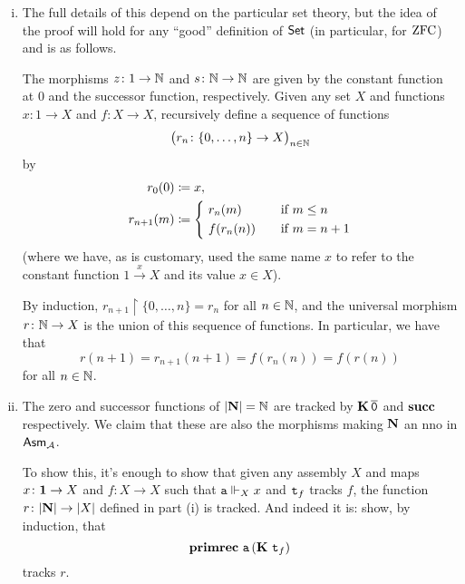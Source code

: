 \begin{enumerate}[(i)]
  \item
    The full details of this depend on the particular set theory, but
    the idea of the proof will hold for any ``good'' definition of \(\mathsf{Set}\)
    (in particular, for \(\mathrm{ZFC}\)) and is as follows.

    The morphisms \(z \colon 1 \to \mathbb N\) and \(s \colon \mathbb N \to \mathbb N\) are
    given by the constant function at \(0\) and the successor function,
    respectively.
    Given any set \(X\) and functions \(x \colon 1 \to X\) and
    \(f \colon X \to X\), recursively define a sequence of functions
    \[ \big(r_n \colon \{0, \dotsc, n\} \to X \big)_{n \in \mathbb N} \]
    by
    \begin{align*}
      r_0(0) & \defeq x, \\
      r_{n+1}(m) & \defeq \left\{\ 
        \begin{aligned}
            & r_n(m) && \quad\text{if \(m \le n\)} \\
            & f(r_n(n)) && \quad\text{if \(m = n+1\)}
        \end{aligned} \right.
    \end{align*}
    (where we have, as is customary, used the same name \(x\) to refer to the
    constant function \(1 \xrightarrow{x} X\) and its value \(x \in X\)).

    By induction,
    \(r_{n+1} \restriction \{0, \dotsc, n\} = r_n\) for all \(n \in \mathbb N\),
    and the universal morphism \(r \colon \mathbb N \to X\) is the union of this
    sequence of functions.
    In particular, we have that
    \[ r(n+1) = r_{n+1}(n+1) = f(r_n(n)) = f(r(n)) \]
    for all \(n \in \mathbb N\).

  \item
    The zero and successor functions of \(\lvert\mathbf N\rvert = \mathbb N\) are
    tracked by \(\operatorname{\mathbf{K}} \operatorname{\overline{\mathtt{0}}}\) and \(\operatorname{\mathbf{succ}}\) respectively.
    We claim that these are also the morphisms making \(\mathbf N\) an nno in
    \(\mathsf{Asm}_{\mathcal A}\).

    To show this, it's enough to show that given any assembly \(X\) and maps
    \(x \colon \mathbf 1 \to X\) and \(f \colon X \to X\) such that
    \(\operatorname{\mathtt{a}} \Vdash_X x\) and \(\operatorname{\mathtt{t}}_f\) tracks \(f\), the function
    \(r \colon \lvert\mathbf N\rvert \to \lvert X\rvert\) defined in part (i) is
    tracked.
    And indeed it is: show, by induction, that
    \[ \operatorname{\mathbf{primrec}} \, \operatorname{\mathtt{a}} \, (\operatorname{\mathbf{K}} \, \operatorname{\mathtt{t}}_f) \]
    tracks \(r\).
\end{enumerate}


